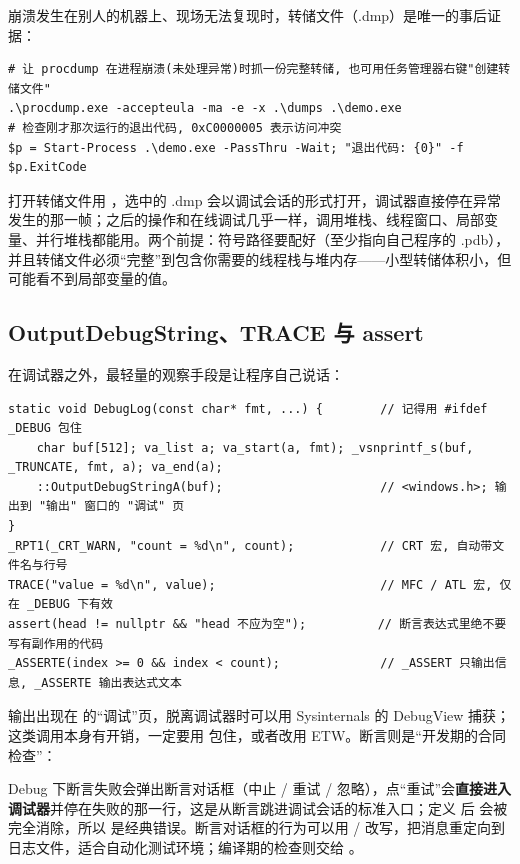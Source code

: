 {崩溃发生在别人的机器上、现场无法复现时，转储文件（.dmp）是唯一的事后证据：

\begin{lstlisting}[style=shellstyle]
# 让 procdump 在进程崩溃(未处理异常)时抓一份完整转储, 也可用任务管理器右键"创建转储文件"
.\procdump.exe -accepteula -ma -e -x .\dumps .\demo.exe
# 检查刚才那次运行的退出代码, 0xC0000005 表示访问冲突
$p = Start-Process .\demo.exe -PassThru -Wait; "退出代码: {0}" -f $p.ExitCode
\end{lstlisting}
打开转储文件用 ，选中的 .dmp 会以调试会话的形式打开，调试器直接停在异常发生的那一帧；之后的操作和在线调试几乎一样，调用堆栈、线程窗口、局部变量、并行堆栈都能用。两个前提：符号路径要配好（至少指向自己程序的 .pdb），并且转储文件必须“完整”到包含你需要的线程栈与堆内存——小型转储体积小，但可能看不到局部变量的值。

\subsection{OutputDebugString、TRACE 与 assert}

在调试器之外，最轻量的观察手段是让程序自己说话：

\begin{lstlisting}[style=cppstyle]
static void DebugLog(const char* fmt, ...) {        // 记得用 #ifdef _DEBUG 包住
    char buf[512]; va_list a; va_start(a, fmt); _vsnprintf_s(buf, _TRUNCATE, fmt, a); va_end(a);
    ::OutputDebugStringA(buf);                      // <windows.h>; 输出到 "输出" 窗口的 "调试" 页
}
_RPT1(_CRT_WARN, "count = %d\n", count);            // CRT 宏, 自动带文件名与行号
TRACE("value = %d\n", value);                       // MFC / ATL 宏, 仅在 _DEBUG 下有效
assert(head != nullptr && "head 不应为空");          // 断言表达式里绝不要写有副作用的代码
_ASSERTE(index >= 0 && index < count);              // _ASSERT 只输出信息, _ASSERTE 输出表达式文本
\end{lstlisting}
输出出现在  的“调试”页，脱离调试器时可以用 Sysinternals 的 DebugView 捕获；这类调用本身有开销，一定要用  包住，或者改用 ETW。断言则是“开发期的合同检查”：

Debug 下断言失败会弹出断言对话框（中止 / 重试 / 忽略），点“重试”会\textbf{直接进入调试器}并停在失败的那一行，这是从断言跳进调试会话的标准入口；定义  后  会被完全消除，所以  是经典错误。断言对话框的行为可以用  /  改写，把消息重定向到日志文件，适合自动化测试环境；编译期的检查则交给 。

}
